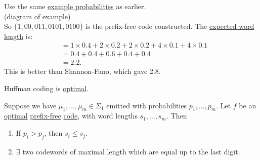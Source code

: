 \documentclass{article}
\begin{document}
\begin{eg}
    Use the same \hyperlink{ex:shannonfano1}{example probabilities} as earlier. \\
    (diagram of example) \\
    So $\{1, 00, 011, 0101, 0100\}$ is the prefix-free code constructed. The \hyperlink{def:ewl}{expected word length} is:
    \begin{align*}
        &= 1 \times 0.4 + 2 \times 0.2 + 2 \times 0.2 + 4 \times 0.1 + 4 \times 0.1 \\
        &= 0.4 + 0.4 + 0.6 + 0.4 + 0.4\\
        &= 2.2.
    \end{align*}
    This is better than Shannon-Fano, which gave 2.8.
\end{eg}

\begin{nthm}\label{thm:huffOpt}
    Huffman coding is \hyperlink{def:optCode}{optimal}.
\end{nthm}
\begin{nlemma}\label{lem:1.6}
    Suppose we have $\mu_1, \dotsc, \mu_m \in \Sigma_1$ emitted with probabilities $p_1, \dotsc, p_m$.
    Let $f$ be an \hyperlink{def:optCode}{optimal} \hyperlink{def:prefixFreeCode}{prefix-free} \hyperlink{def:code}{code}, with word lengths $s_1, \dotsc, s_m$.
    Then
    \begin{enumerate}[label=\roman*)]
        \item If $p_i > p_j$, then $s_i \leq s_j$.
        \item $\exists$ two codewords of maximal length which are equal up to the last digit.
    \end{enumerate}
\end{nlemma}
\end{document}
